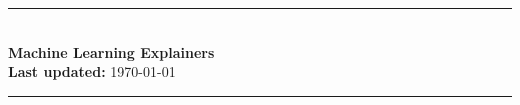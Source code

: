 \documentclass[11pt]{article}
\begin{document}
\begin{center}
\hspace*{\fill}\rule{0.95\linewidth}{0.1pt}\hspace*{\fill}\\[0.6cm]
{\huge\bfseries Machine Learning Explainers}\\[0.1cm]
\textbf{Last updated:} \today\\
\hspace*{\fill}\rule{0.95\linewidth}{0.1pt}\hspace*{\fill}\\
\end{center}

\begin{abstract}
    \noindent Summaries of some machine/deep learning-related topics. My main motive in writing these summaries is as a reminder for my future self.
\end{abstract}

\setcounter{tocdepth}{2}{\footnotesize\tableofcontents}




\thispagestyle{empty}
\setcounter{page}{0}
\newpage

\end{document}
